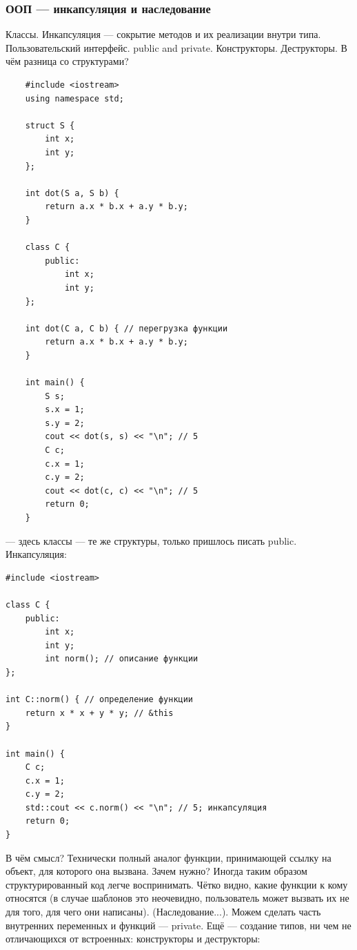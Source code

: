 \documentclass{book}
\begin{document}
\subsubsection{ООП --- инкапсуляция и наследование}
Классы. Инкапсуляция --- сокрытие методов и их реализации внутри типа. Пользовательский интерфейс.
public and private. Конструкторы. Деструкторы. В чём разница со структурами?
\begin{verbatim}
    #include <iostream>
    using namespace std;

    struct S {
        int x;
        int y;
    };

    int dot(S a, S b) {
        return a.x * b.x + a.y * b.y;
    }

    class C {
        public:
            int x;
            int y;
    };

    int dot(C a, C b) { // перегрузка функции
        return a.x * b.x + a.y * b.y;
    }

    int main() {
        S s;
        s.x = 1;
        s.y = 2;
        cout << dot(s, s) << "\n"; // 5
        C c;
        c.x = 1;
        c.y = 2;
        cout << dot(c, c) << "\n"; // 5
        return 0;
    }
\end{verbatim}
--- здесь классы --- те же структуры, только пришлось писать public. Инкапсуляция:
\begin{verbatim}
#include <iostream>

class C {
    public:
        int x;
        int y;
        int norm(); // описание функции
};

int C::norm() { // определение функции
    return x * x + y * y; // &this
}

int main() {
    C c;
    c.x = 1;
    c.y = 2;
    std::cout << c.norm() << "\n"; // 5; инкапсуляция
    return 0;
}
\end{verbatim}
В чём смысл? Технически полный аналог функции, принимающей ссылку на объект, для которого она
вызвана. Зачем нужно? Иногда таким образом структурированный код легче воспринимать. Чётко видно,
какие функции к кому относятся (в случае шаблонов это неочевидно, пользователь может вызвать их не
для того, для чего они написаны). (Наследование...). Можем сделать часть внутренних переменных и
функций --- private. Ещё --- создание типов, ни чем не отличающихся от встроенных: конструкторы и
деструкторы:
\end{document}
